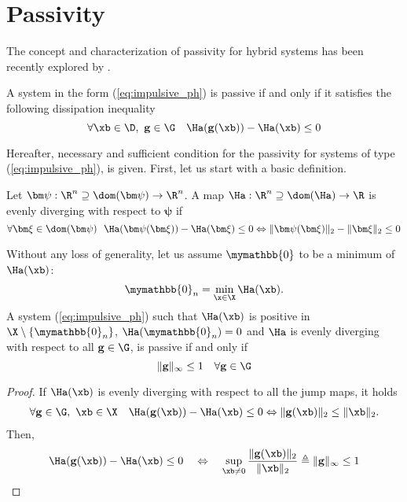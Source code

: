\section{Passivity}
%
The concept and characterization of passivity for hybrid systems has been recently explored by \cite{naldi2013passivity}.
%
\begin{defn}\label{def:impulsive_passivity}
    A system in the form (\ref{eq:impulsive_ph}) is passive if and only if it satisfies the following dissipation inequality
    \begin{equation}
        \forall\xb\in\D,~\mathbf{g}\in\G \quad \Ha(\mathbf{g}(\xb))-\Ha(\xb)\leq 0
    \end{equation}
\end{defn}
%
Hereafter, necessary and sufficient condition for the passivity for systems of type (\ref{eq:impulsive_ph}), is given. First, let us start with a basic definition.
%
\begin{defn}
	Let $\bm\psi:\R^n\supseteq\dom(\bm\psi)\rightarrow\R^n$. A map $\Ha:\R^n\supseteq\dom(\Ha)\rightarrow\R$ is evenly diverging with respect to $\bm\psi$ if
	\begin{equation}
	    \forall\bm\xi\in\dom(\bm\psi)~~\Ha(\bm\psi(\bm\xi))-\Ha(\bm\xi)\leq 0 \Leftrightarrow \|\bm\psi(\bm\xi)\|_2-\|\bm\xi\|_2\leq {0}
	\end{equation}
\end{defn}
%
\begin{prop}\label{prop:pass_impulsive}
	Without any loss of generality, let us assume $\mymathbb{0}$ to be a minimum of $\Ha(\xb)$:
	\begin{equation}
	    \mymathbb{0}_n = \min_{\x\in\X}\Ha(\xb).
	\end{equation}
	A system (\ref{eq:impulsive_ph}) such that $\Ha(\xb)$ is positive in $\X\setminus\{\mymathbb{0}_n\}$, $\Ha(\mymathbb{0}_n)=0$ and $\Ha$ is evenly diverging with respect to all $\mathbf{g}\in\G$, is passive if and only if 
	\begin{equation}\label{eq:nl_pass}
		\|\mathbf{g}\|_\infty\leq 1\quad\forall \mathbf{g}\in\G
	\end{equation}
\end{prop}
%
\begin{proof}
	If $\Ha(\xb)$ is evenly diverging with respect to all the jump maps, it holds
	\begin{align}
	    \forall\mathbf{g}\in\G,~\xb\in\X\quad\Ha(\mathbf{g}(\xb))-\Ha(\xb)\leq 0 \Leftrightarrow \|\mathbf{g}(\xb)\|_2 \leq \|\xb\|_2.
	\end{align}
	Then,
	\begin{align*}
	\Ha(\mathbf{g}(\xb))-\Ha(\xb)\leq 0 \quad \Leftrightarrow \quad \sup\limits_{\xb\neq 0}\frac{\|\mathbf{g}(\xb)\|_2}{\|\xb\|_2} \triangleq \|\mathbf{g}\|_\infty\leq 1
	\end{align*}
\end{proof}
